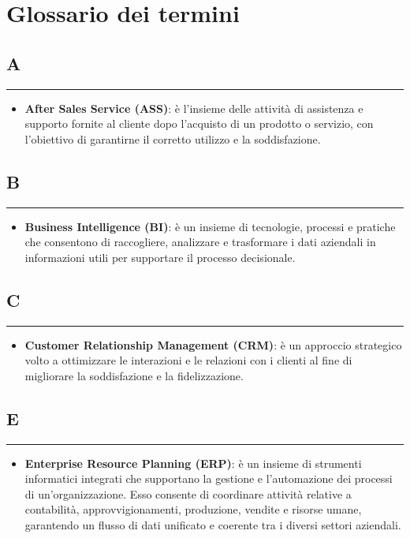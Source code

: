\chapter{Glossario dei termini}
\newenvironment{glossaryitemize}
  {\begin{itemize}[label={}, leftmargin=*]}
  {\end{itemize}}

\section*{A}
{\color{lightgray}\rule{\textwidth}{0.4pt}} %
\begin{glossaryitemize}
    \item \textbf{After Sales Service (ASS)}: è l'insieme delle attività di assistenza e supporto fornite al cliente dopo l'acquisto di un prodotto o servizio, con l'obiettivo di garantirne il corretto utilizzo e la soddisfazione.
\end{glossaryitemize}

\section*{B}
{\color{lightgray}\rule{\textwidth}{0.4pt}} %
\begin{glossaryitemize}
    \item \textbf{Business Intelligence (BI)}: è un insieme di tecnologie, processi e pratiche che consentono di raccogliere, analizzare e trasformare i dati aziendali in informazioni utili per supportare il processo decisionale.
\end{glossaryitemize}

\section*{C}
{\color{lightgray}\rule{\textwidth}{0.4pt}} %
\begin{glossaryitemize}
    \item \textbf{Customer Relationship Management (CRM)}: è un approccio strategico volto a ottimizzare le interazioni e le relazioni con i clienti al fine di migliorare la soddisfazione e la fidelizzazione.
\end{glossaryitemize}

\section*{E}
{\color{lightgray}\rule{\textwidth}{0.4pt}} %
\begin{glossaryitemize}
    \item \textbf{Enterprise Resource Planning (ERP)}: è un insieme di strumenti informatici integrati che supportano la gestione e l'automazione dei processi di un'organizzazione. Esso consente di coordinare attività relative a contabilità, approvvigionamenti, produzione, vendite e risorse umane, garantendo un flusso di dati unificato e coerente tra i diversi settori aziendali. 
\end{glossaryitemize}

